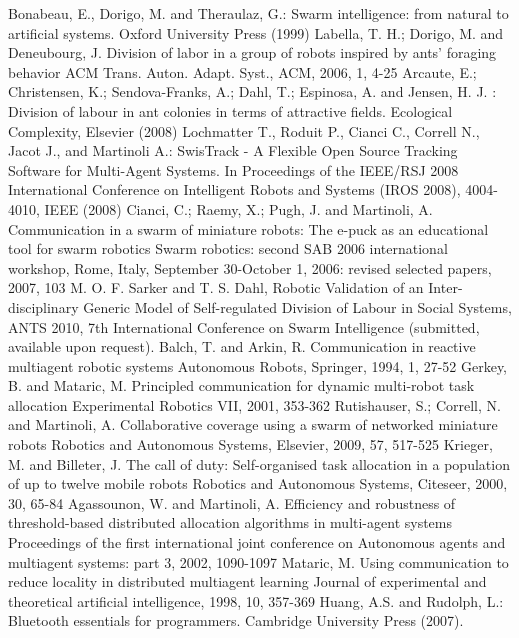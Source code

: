 \documentclass[letterpaper, 10 pt, conference]{ieeeconf}  %
\begin{document}
\begin{thebibliography}{99}
Bonabeau, E., Dorigo, M. and Theraulaz, G.:
Swarm intelligence: from natural to artificial systems.
Oxford University Press (1999)
Labella, T. H.; Dorigo, M. and Deneubourg, J. Division of labor in a group of robots inspired by ants' foraging behavior ACM Trans. Auton. Adapt. Syst., ACM, 2006, 1, 4-25
Arcaute, E.; Christensen, K.; Sendova-Franks, A.; Dahl, T.; Espinosa, A. and Jensen, H. J. : 
Division of labour in ant colonies in terms of attractive fields. 
Ecological Complexity, Elsevier (2008)
Lochmatter T., Roduit P., Cianci C., Correll N., Jacot J., and Martinoli A.: 
SwisTrack - A Flexible Open Source Tracking Software for Multi-Agent Systems. 
In Proceedings of the IEEE/RSJ 2008 International Conference on Intelligent Robots and Systems (IROS 2008), 4004-4010, IEEE (2008)
Cianci, C.; Raemy, X.; Pugh, J. and Martinoli, A. Communication in a swarm of miniature robots: The e-puck as an educational tool for swarm robotics Swarm robotics: second SAB 2006 international workshop, Rome, Italy, September 30-October 1, 2006: revised selected papers, 2007, 103
M. O. F. Sarker and T. S. Dahl, Robotic Validation of an Inter-disciplinary Generic
Model of Self-regulated Division of Labour in Social Systems, ANTS 2010, 7th International Conference on Swarm Intelligence (submitted, available upon request).
Balch, T. and Arkin, R. Communication in reactive multiagent robotic systems Autonomous Robots, Springer, 1994, 1, 27-52
Gerkey, B. and Mataric, M. Principled communication for dynamic multi-robot task allocation Experimental Robotics VII, 2001, 353-362
Rutishauser, S.; Correll, N. and Martinoli, A. Collaborative coverage using a swarm of networked miniature robots Robotics and Autonomous Systems, Elsevier, 2009, 57, 517-525
Krieger, M. and Billeter, J. The call of duty: Self-organised task allocation in a population of up to twelve mobile robots Robotics and Autonomous Systems, Citeseer, 2000, 30, 65-84
Agassounon, W. and Martinoli, A. Efficiency and robustness of threshold-based distributed allocation algorithms in multi-agent systems Proceedings of the first international joint conference on Autonomous agents and multiagent systems: part 3, 2002, 1090-1097
Mataric, M. Using communication to reduce locality in distributed multiagent learning Journal of experimental and theoretical artificial intelligence, 1998, 10, 357-369
Huang, A.S. and Rudolph, L.:
Bluetooth essentials for programmers.
Cambridge University Press (2007).


\end{thebibliography}
\end{document}
